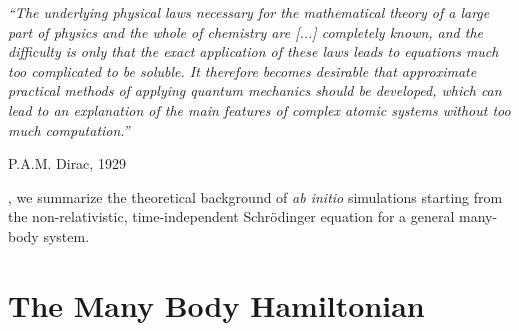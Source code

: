 \epigraph{\singlespacing \it ``The underlying physical laws necessary
for the mathematical theory of a large part of physics and the whole of chemistry
are [...] completely known, and the difficulty is only that the exact application
of these laws leads to equations much too complicated to be soluble. It therefore becomes desirable that approximate practical methods of applying quantum
mechanics should be developed, which can lead to an explanation of the main
features of complex atomic systems without too much computation.''}{P.A.M. Dirac, 1929~\cite{Dirac1929}}

, we summarize the theoretical background of {\it ab initio} simulations starting from the non-relativistic, time-independent Schrödinger equation for a general many-body system.

\section{The Many Body Hamiltonian}

